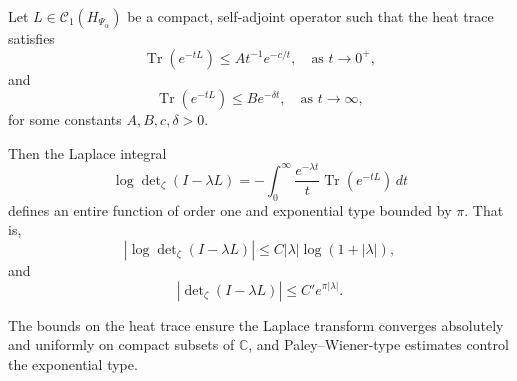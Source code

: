 \begin{lemma}
\label{lem:laplace_preserves_entire_type}
Let \( L \in \mathcal{C}_1(H_{\Psi_\alpha}) \) be a compact, self-adjoint operator such that the heat trace satisfies
\[
\operatorname{Tr}(e^{-tL}) \le A t^{-1} e^{-c/t}, \quad \text{as } t \to 0^+,
\]
and
\[
\operatorname{Tr}(e^{-tL}) \le B e^{-\delta t}, \quad \text{as } t \to \infty,
\]
for some constants \( A,B,c,\delta > 0 \).

Then the Laplace integral
\[
\log \det\nolimits_\zeta(I - \lambda L)
= - \int_0^\infty \frac{e^{-\lambda t}}{t} \operatorname{Tr}(e^{-tL})\, dt
\]
defines an entire function of order one and exponential type bounded by \( \pi \). That is,
\[
\left| \log \det\nolimits_\zeta(I - \lambda L) \right| \le C |\lambda| \log(1 + |\lambda|),
\]
and
\[
\left| \det\nolimits_\zeta(I - \lambda L) \right| \le C' e^{\pi |\lambda|}.
\]
\end{lemma}

\medskip
\noindent
The bounds on the heat trace ensure the Laplace transform converges absolutely and uniformly on compact subsets of \( \mathbb{C} \), and Paley–Wiener-type estimates control the exponential type.
%  